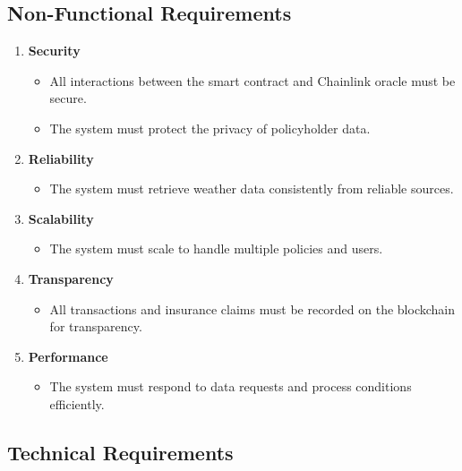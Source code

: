 \subsection{Non-Functional Requirements}

\begin{enumerate}
    \item \textbf{Security}
    \begin{itemize}
        \item All interactions between the smart contract and Chainlink oracle must be secure.
        \item The system must protect the privacy of policyholder data.
    \end{itemize}
    
    \item \textbf{Reliability}
    \begin{itemize}
        \item The system must retrieve weather data consistently from reliable sources.
    \end{itemize}
    
    \item \textbf{Scalability}
    \begin{itemize}
        \item The system must scale to handle multiple policies and users.
    \end{itemize}
    
    \item \textbf{Transparency}
    \begin{itemize}
        \item All transactions and insurance claims must be recorded on the blockchain for transparency.
    \end{itemize}
    
    \item \textbf{Performance}
    \begin{itemize}
        \item The system must respond to data requests and process conditions efficiently.
    \end{itemize}
\end{enumerate}

\subsection{Technical Requirements}

